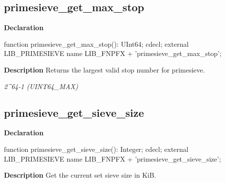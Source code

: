 \documentclass{report}
\newif\ifpdf
\begin{document}
\subsection*{primesieve{\_}get{\_}max{\_}stop}
\fi
\label{primesieve-primesieve_get_max_stop}
\begin{list}{}{
\setlength{\itemindent}{0cm}
\setlength{\listparindent}{0cm}
\setlength{\leftmargin}{\evensidemargin}
\addtolength{\leftmargin}{\tmplength}
\settowidth{\labelsep}{X}
\addtolength{\leftmargin}{\labelsep}
\setlength{\labelwidth}{\tmplength}
}
\item[\textbf{Declaration}\hfill]
\ifpdf
\begin{flushleft}
\fi
\begin{ttfamily}
function primesieve{\_}get{\_}max{\_}stop(): UInt64; cdecl; external LIB{\_}PRIMESIEVE name LIB{\_}FNPFX + 'primesieve{\_}get{\_}max{\_}stop';\end{ttfamily}

\ifpdf
\end{flushleft}
\fi

\par
\item[\textbf{Description}]
Returns the largest valid stop number for primesieve.

\textit{2{\^{}}64{-}1 (UINT64{\_}MAX)}

\end{list}
\ifpdf
\subsection*{\large{\textbf{primesieve{\_}get{\_}sieve{\_}size}}\normalsize\hspace{1ex}\hrulefill}
\else
\subsection*{primesieve{\_}get{\_}sieve{\_}size}
\fi
\label{primesieve-primesieve_get_sieve_size}
\begin{list}{}{
\setlength{\itemindent}{0cm}
\setlength{\listparindent}{0cm}
\setlength{\leftmargin}{\evensidemargin}
\addtolength{\leftmargin}{\tmplength}
\settowidth{\labelsep}{X}
\addtolength{\leftmargin}{\labelsep}
\setlength{\labelwidth}{\tmplength}
}
\item[\textbf{Declaration}\hfill]
\ifpdf
\begin{flushleft}
\fi
\begin{ttfamily}
function primesieve{\_}get{\_}sieve{\_}size(): Integer; cdecl; external LIB{\_}PRIMESIEVE name LIB{\_}FNPFX + 'primesieve{\_}get{\_}sieve{\_}size';\end{ttfamily}

\ifpdf
\end{flushleft}
\fi

\par
\item[\textbf{Description}]
Get the current set sieve size in KiB.

\end{list}
\ifpdf
\end{document}
